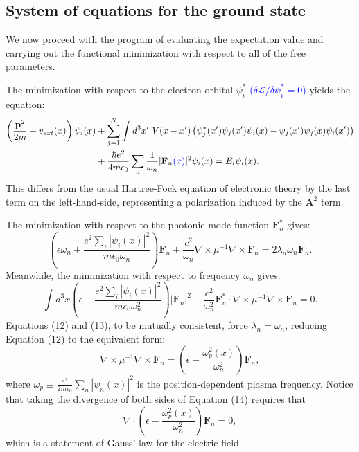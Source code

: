 \documentclass[aps,prb,onecolumn,
	groupedaddress,superscriptaddress,
	amsfonts,amssymb,amsmath,floatfix,
	citeautoscript]{revtex4-1}
\newcommand{\Jadd}[1]{\textcolor{blue}{#1}}
\begin{document}
\subsection{System of equations for the ground state}
We now proceed with the program of evaluating the expectation value and carrying out the functional minimization with respect to all of the free parameters. 

The minimization with respect to the electron orbital $\psi_i^*$ \Jadd{($\delta\mathcal{L}/\delta\psi_i^*=0$) }yields the equation:
\begin{align}
\left(\frac{\mathbf{p}^2}{2m}+v_{ext}(x) \right)\psi_i(x) &+  \sum\limits_{j=1}^N \int d^3x' ~ V(x-x')\left(\psi^*_j(x')\psi_j(x')\psi_i(x) - \psi_j(x')\psi_j(x)\psi_i(x')  \right) \nonumber \\ &+ \frac{\hbar e^2}{4m\epsilon_0}\sum_n \frac{1}{\omega_n}|\mathbf{F}_n\Jadd{(x)}|^2\psi_i(x)  = E_i\psi_i(x).
\end{align}
This differs from the usual Hartree-Fock equation of electronic theory by the last term on the left-hand-side, representing a polarization induced by the $\mathbf{A}^2$ term.

The minimization with respect to the photonic mode function $\mathbf{F}_n^*$ gives:
\begin{equation}
\left(\epsilon\omega_n+\frac{e^2\sum_i|\psi_i(x)|^2}{m\epsilon_0\omega_n} \right)\mathbf{F}_n + \frac{c^2}{\omega_n}\nabla\times\mu^{-1}\nabla\times\mathbf{F}_n = 2\lambda_n\omega_n\mathbf{F}_n.
\end{equation}
Meanwhile, the minimization with respect to frequency $\omega_n$ gives:
\begin{equation}
\int d^3x\left(\epsilon - \frac{e^2\sum_i|\psi_i(x)|^2}{m\epsilon_0\omega^2_n}\right)|\mathbf{F}_n|^2 - \frac{c^2}{\omega_n^2}\mathbf{F}_n^*\cdot\nabla\times\mu^{-1}\nabla\times\mathbf{F}_n=0.
\end{equation}
Equations (12) and (13), to be mutually consistent, force $\lambda_n = \omega_n$, reducing Equation (12) to the equivalent form:
\begin{equation}
\nabla\times\mu^{-1}\nabla\times\mathbf{F}_n = \left(\epsilon - \frac{\omega_p^2(x)}{\omega_n^2} \right)\mathbf{F}_n,
\end{equation}
where $\omega_p \equiv \frac{e^2}{2m\epsilon_0}\sum_n|\psi_n(x)|^2$ is the position-dependent plasma frequency. Notice that taking the divergence of both sides of Equation (14) requires that
\begin{equation}
\nabla\cdot\left(\epsilon - \frac{\omega_p^2(x)}{\omega_n^2} \right)\mathbf{F}_n = 0,
\end{equation}
which is a statement of Gauss' law for the electric field.
\end{document}
